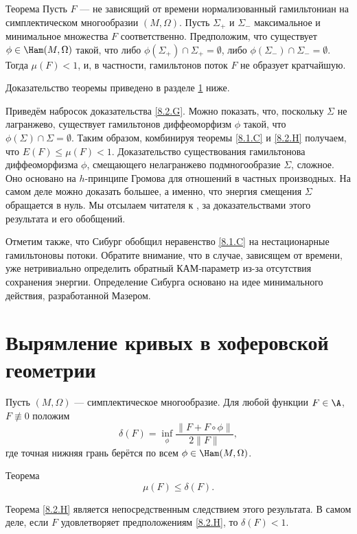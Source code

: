 \begin{thm}{Теорема}\label{8.2.H}
Пусть $F$ --- не зависящий от времени нормализованный гамильтониан на симплектическом многообразии $ (M, \Omega)$.
Пусть $\Sigma_+$  и $\Sigma_-$  максимальное и минимальное множества $F$ соответственно.
Предположим, что существует $\phi \in \Ham (M, \Omega)$ такой, что либо $\phi (\Sigma_+) \cap \Sigma_+ = \emptyset$, либо $\phi (\Sigma_-) \cap \Sigma_- = \emptyset$.
Тогда $\mu (F) <1$, и, в частности, гамильтонов поток $F$ не образует кратчайшую.
\end{thm}

Доказательство теоремы приведено в разделе \ref{sec:8.3} ниже.

Приведём набросок доказательства \ref{8.2.G}.
Можно показать, что, поскольку $\Sigma$ не лагранжево, существует гамильтонов диффеоморфизм $\phi$ такой, что $\phi (\Sigma) \cap \Sigma = \emptyset$.
Таким образом, комбинируя теоремы \ref{8.1.C} и \ref{8.2.H} получаем, что $E (F) \le \mu (F) <1$.
Доказательство существования гамильтонова диффеоморфизма $\phi$, смещающего нелагранжево подмногообразие $\Sigma$, сложное.
Оно основано на $h$-принципе Громова для отношений в частных производных.
На самом деле можно доказать большее, а именно, что энергия смещения $\Sigma$ обращается в нуль.
Мы отсылаем читателя к \cite{P2}, \cite{LS} за доказательствами этого результата и его обобщений.

Отметим также, что Сибург \cite{Si2} обобщил неравенство \ref{8.1.C} на нестационарные гамильтоновы потоки.
Обратите внимание, что в случае, зависящем от времени, уже нетривиально определить обратный КАМ-параметр из-за отсутствия сохранения энергии.
Определение Сибурга основано на идее минимального действия, разработанной Мазером.

\section{Вырямление кривых в хоферовской геометрии}\label{sec:8.3}

Пусть $(M, \Omega)$ --- симплектическое многообразие.
Для любой функции $F \in \A$, $F \not\equiv 0$ положим 
\[\delta(F)=\inf_\phi \frac{\|F+ F \circ \phi\|}{2\|F\|},\]
где точная нижняя грань берётся по всем $\phi \in \Ham (M, \Omega)$.

\begin{thm}[(\cite{BP2})]{Теорема}\label{8.3.A}
\[\mu (F) \le \delta (F).\]
\end{thm}

Теорема \ref{8.2.H} является непосредственным следствием этого результата.
В самом деле, если $F$ удовлетворяет предположениям \ref{8.2.H}, то $\delta (F) <1$.

